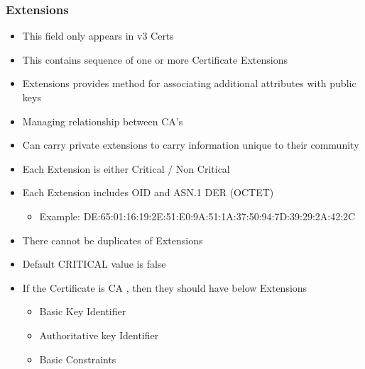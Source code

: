 \documentclass[12pt]{report}
\begin{document}
    \subsubsection{Extensions}
        \begin{itemize}
            \item This field only appears in v3 Certs
            \item This contains sequence of one or more Certificate Extensions 
            \item Extensions provides method for associating additional attributes with public keys
            \item Managing relationship between CA's
            \item Can carry private extensions to carry information unique to their community
            \item Each Extension is either Critical / Non Critical
            \item Each Extension includes OID and ASN.1 DER  (OCTET)
                \begin{itemize}
                    \item Example: DE:65:01:16:19:2E:51:E0:9A:51:1A:37:50:94:7D:39:29:2A:42:2C
                \end{itemize}
            \item There cannot be duplicates of Extensions
            \item Default CRITICAL value is false
            \item If the Certificate is CA , then they should have below Extensions
                \begin{itemize}
                    \item Basic Key Identifier
                    \item Authoritative key Identifier
                    \item Basic Constraints
                \end{itemize}
        \end{itemize}
\end{document}
